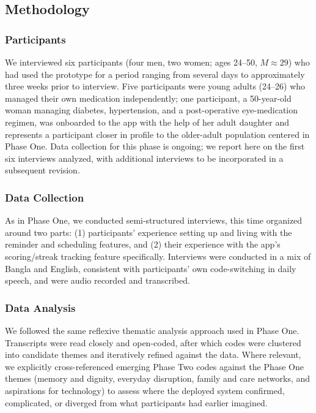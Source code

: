 \documentclass[acmlarge]{acmart}
\begin{document}
\subsection{Methodology}

\subsubsection{Participants}
We interviewed six participants (four men, two women; ages 24--50, $M
\approx 29$) who had used the prototype for a period ranging from several
days to approximately three weeks prior to interview. Five participants were
young adults (24--26) who managed their own medication independently; one
participant, a 50-year-old woman managing diabetes, hypertension, and a
post-operative eye-medication regimen, was onboarded to the app with the
help of her adult daughter and represents a participant closer in profile to
the older-adult population centered in Phase One. Data collection for this
phase is ongoing; we report here on the first six interviews analyzed, with
additional interviews to be incorporated in a subsequent revision.

\subsubsection{Data Collection}
As in Phase One, we conducted semi-structured interviews, this time
organized around two parts: (1) participants' experience setting up and
living with the reminder and scheduling features, and (2) their experience
with the app's scoring/streak tracking feature specifically. Interviews were
conducted in a mix of Bangla and English, consistent with participants'
own code-switching in daily speech, and were audio recorded and transcribed.

\subsubsection{Data Analysis}
We followed the same reflexive thematic analysis approach used in Phase One.
Transcripts were read closely and open-coded, after which codes
were clustered into candidate themes and iteratively refined against the
data. Where relevant, we explicitly cross-referenced emerging Phase Two
codes against the Phase One themes (memory and dignity, everyday disruption,
family and care networks, and aspirations for technology) to assess where
the deployed system confirmed, complicated, or diverged from what
participants had earlier imagined.
\end{document}
